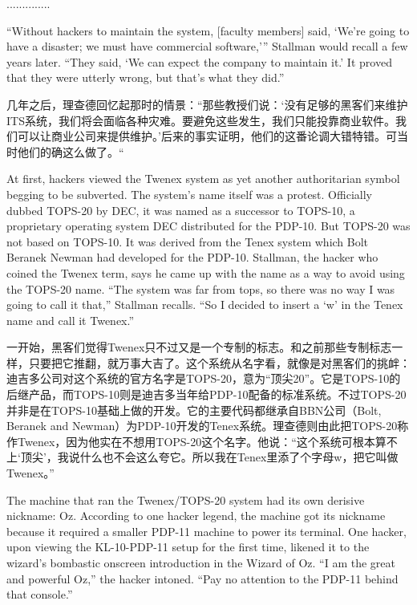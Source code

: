 \ifdefined\chs
..............
\fi

\ifdefined\eng
``Without hackers to maintain the system, [faculty members] said, `We're going to have a disaster; we must have commercial software,'\hspace{0.01in}'' Stallman would recall a few years later. ``They said, `We can expect the company to maintain it.' It proved that they were utterly wrong, but that's what they did.''
\fi

\ifdefined\chs
几年之后，理查德回忆起那时的情景：“那些教授们说：‘没有足够的黑客们来维护ITS系统，我们将会面临各种灾难。要避免这些发生，我们只能投靠商业软件。我们可以让商业公司来提供维护。’后来的事实证明，他们的这番论调大错特错。可当时他们的确这么做了。“
\fi

\ifdefined\eng
At first, hackers viewed the Twenex system as yet another authoritarian symbol begging to be subverted. The system's name itself was a protest. Officially dubbed TOPS-20 by DEC, it was named as a successor to TOPS-10, a proprietary operating system DEC distributed for the PDP-10. But TOPS-20 was not based on TOPS-10.  It was derived from the Tenex system which Bolt Beranek Newman had developed for the PDP-10. Stallman, the hacker who coined the Twenex term, says he came up with the name as a way to avoid using the TOPS-20 name. ``The system was far from tops, so there was no way I was going to call it that,'' Stallman recalls. ``So I decided to insert a `w' in the Tenex name and call it Twenex.''
\fi

\ifdefined\chs
一开始，黑客们觉得Twenex只不过又是一个专制的标志。和之前那些专制标志一样，只要把它推翻，就万事大吉了。这个系统从名字看，就像是对黑客们的挑衅：迪吉多公司对这个系统的官方名字是TOPS-20，意为“顶尖20”。它是TOPS-10的后继产品，而TOPS-10则是迪吉多当年给PDP-10配备的标准系统。不过TOPS-20并非是在TOPS-10基础上做的开发。它的主要代码都继承自BBN公司（Bolt, Beranek and Newman）为PDP-10开发的Tenex系统。理查德则由此把TOPS-20称作Twenex，因为他实在不想用TOPS-20这个名字。他说：“这个系统可根本算不上‘顶尖’，我说什么也不会这么夸它。所以我在Tenex里添了个字母w，把它叫做Twenex。”
\fi

\ifdefined\eng
The machine that ran the Twenex/TOPS-20 system had its own derisive nickname: Oz. According to one hacker legend, the machine got its nickname because it required a smaller PDP-11 machine to power its terminal. One hacker, upon viewing the KL-10-PDP-11 setup for the first time, likened it to the wizard's bombastic onscreen introduction in the Wizard of Oz. ``I am the great and powerful Oz,'' the hacker intoned. ``Pay no attention to the PDP-11 behind that console.''
\fi


